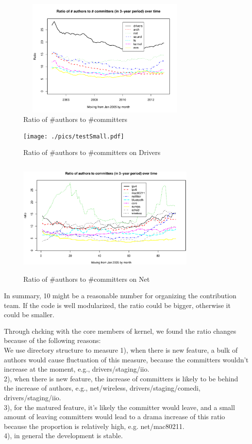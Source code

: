 \documentclass{sig-alternate-05-2015}
\begin{document}
\begin{figure}
\centering
\includegraphics[height=2.33in, width=3.5in]{./pics/a2c-in-mod.pdf}
\caption{Ratio of \#authors to \#committers}
\label{fig:atr2cmtr}
\end{figure}

\begin{figure}
\centering
\texttt{[image: ./pics/testSmall.pdf]}
\caption{Ratio of \#authors to \#committers on Drivers}
\label{fig:ratiodrivers}
\end{figure}

\begin{figure}
\centering
\includegraphics[height=2.33in, width=3.5in]{./pics/atr2cmtrNET.eps}
\caption{Ratio of \#authors to \#committers on Net}
\label{fig:rationet}
\end{figure}

In summary, 10 might be a reasonable number for organizing the contribution
team. If the code is well modularized, the ratio could be bigger, otherwise
it could be smaller.

Through chcking with the core members of kernel, we found the ratio changes because of the following reasons: \\
We use directory structure to measure 
1), when there is new feature, a bulk of authors would cause fluctuation of this measure,
because the committers wouldn't increase at the moment, e.g., drivers/staging/iio. \\
2), when there is new feature, the increase of committers is likely to be behind
the increase of authors, e.g., net/wireless, drivers/staging/comedi, drivers/staging/iio.  \\
3), for the matured feature, it's likely the committer would leave, and a small amount
of leaving committers would lead to a drama increase of this ratio because the proportion
is relatively high, e.g. net/mac80211. \\
4), in general the development is stable.
\end{document}
